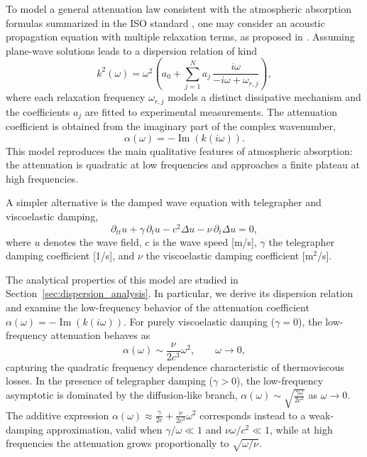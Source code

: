 \documentclass{Configuration_Files/PoliMi3i_thesis}
\newif\ifshowthesischanges
\DeclareRobustCommand{\thesischange}[2]{%
    \ifshowthesischanges
        \textcolor{#1}{#2}%
    \else
        #2%
    \fi
}
\def\thesischange#1#2{#2}%
\begin{document}
To model a general attenuation law consistent with the atmospheric absorption formulas summarized in the ISO standard \cite{iso_acoustics_1993}, one may consider an acoustic propagation equation with multiple relaxation terms, as proposed in \cite{nachman_equation_1990}. Assuming plane-wave solutions leads to a dispersion relation of kind
\begin{equation*}
k^2(\omega)
=
\omega^2\left(
a_0+
\sum_{j=1}^{N}
a_j\,
\frac{i\omega}{-i\omega+\omega_{r,j}}
\right),
\end{equation*}
where each relaxation frequency $\omega_{r,j}$ models a distinct dissipative mechanism and the coefficients $a_j$ are fitted to experimental measurements. The attenuation coefficient is obtained from the imaginary part of the complex wavenumber,
\[
\alpha(\omega)=-\operatorname{Im}(k(i\omega)).
\]
This model reproduces the main qualitative features of atmospheric absorption: the attenuation is quadratic at low frequencies and approaches a finite plateau at high frequencies.

A simpler alternative is the damped wave equation with telegrapher and viscoelastic damping,
\begin{equation*}
\partial_{tt}u
+\gamma\,\partial_tu
-c^2\Delta u
-\nu\,\partial_t\Delta u
=0,
\end{equation*}
where $u$ denotes the wave field, $c$ is the wave speed [m/s], $\gamma$ the telegrapher damping coefficient [1/s], and $\nu$ the viscoelastic damping coefficient [m$^2$/s].

\thesischange{red}{The analytical properties of this model are studied in Section~\ref{sec:dispersion_analysis}. In particular, we derive its dispersion relation and examine the low-frequency behavior of the attenuation coefficient $\alpha(\omega) = -\operatorname{Im}(k(i\omega))$. For purely viscoelastic damping ($\gamma=0$), the low-frequency attenuation behaves as
\begin{equation*}
\alpha(\omega)
\sim
\frac{\nu}{2c^3}\omega^2,
\qquad
\omega\rightarrow0,
\end{equation*}
capturing the quadratic frequency dependence characteristic of thermoviscous losses. In the presence of telegrapher damping ($\gamma>0$), the low-frequency asymptotic is dominated by the diffusion-like branch, $\alpha(\omega) \sim \sqrt{\frac{\gamma\omega}{2c^2}}$ as $\omega\rightarrow0$. The additive expression $\alpha(\omega) \approx \frac{\gamma}{2c} + \frac{\nu}{2c^3}\omega^2$ corresponds instead to a weak-damping approximation, valid when $\gamma/\omega \ll 1$ and $\nu\omega/c^2 \ll 1$, while at high frequencies the attenuation grows proportionally to $\sqrt{\omega/\nu}$.}
\end{document}
